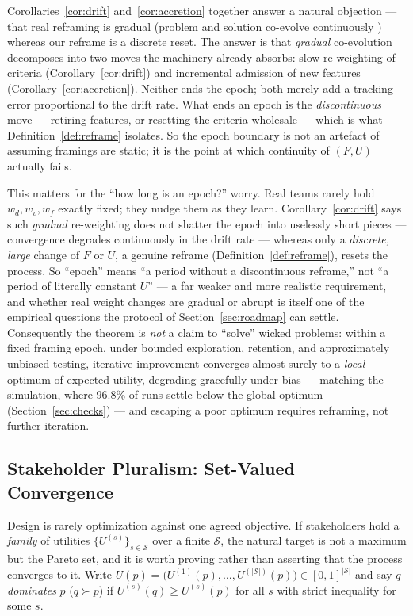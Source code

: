 \documentclass[11pt]{article}
\begin{document}
\noindent Corollaries~\ref{cor:drift} and~\ref{cor:accretion} together answer a natural objection --- that real reframing is gradual (problem and solution co-evolve continuously \citep{dorstcross2001}) whereas our reframe is a discrete reset. The answer is that \emph{gradual} co-evolution decomposes into two moves the machinery already absorbs: slow re-weighting of criteria (Corollary~\ref{cor:drift}) and incremental admission of new features (Corollary~\ref{cor:accretion}). Neither ends the epoch; both merely add a tracking error proportional to the drift rate. What ends an epoch is the \emph{discontinuous} move --- retiring features, or resetting the criteria wholesale --- which is what Definition~\ref{def:reframe} isolates. So the epoch boundary is not an artefact of assuming framings are static; it is the point at which continuity of $(F,U)$ actually fails.

\noindent This matters for the ``how long is an epoch?'' worry. Real teams rarely hold $w_d,w_v,w_f$ exactly fixed; they nudge them as they learn. Corollary~\ref{cor:drift} says such \emph{gradual} re-weighting does not shatter the epoch into uselessly short pieces --- convergence degrades continuously in the drift rate --- whereas only a \emph{discrete, large} change of $F$ or $U$, a genuine reframe (Definition~\ref{def:reframe}), resets the process. So ``epoch'' means ``a period without a discontinuous reframe,'' not ``a period of literally constant $U$'' --- a far weaker and more realistic requirement, and whether real weight changes are gradual or abrupt is itself one of the empirical questions the protocol of Section~\ref{sec:roadmap} can settle. Consequently the theorem is \emph{not} a claim to ``solve'' wicked problems: within a fixed framing epoch, under bounded exploration, retention, and approximately unbiased testing, iterative improvement converges almost surely to a \emph{local} optimum of expected utility, degrading gracefully under bias --- matching the simulation, where $96.8\%$ of runs settle below the global optimum (Section~\ref{sec:checks}) --- and escaping a poor optimum requires reframing, not further iteration.

\subsection{Stakeholder Pluralism: Set-Valued Convergence}
\label{sec:pareto}

Design is rarely optimization against one agreed objective. If stakeholders hold a \emph{family} of utilities $\{U^{(s)}\}_{s\in\mathcal S}$ over a finite $\mathcal S$, the natural target is not a maximum but the Pareto set, and it is worth proving rather than asserting that the process converges to it. Write $U(p)=\big(U^{(1)}(p),\dots,U^{(|\mathcal S|)}(p)\big)\in[0,1]^{|\mathcal S|}$ and say $q$ \emph{dominates} $p$ ($q\succ p$) if $U^{(s)}(q)\ge U^{(s)}(p)$ for all $s$ with strict inequality for some $s$.
\end{document}

